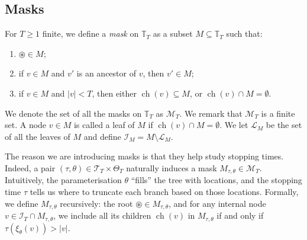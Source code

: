 \documentclass[10pt, a4paper]{article}
\newcommand{\Ell}{\mathcal L}
\newcommand{\I}{\mathcal I}
\newcommand{\ROOT}{\circledast}
\newcommand{\T}{\mathcal T}
\newcommand{\Tt}{\mathbb T}
\DeclareMathOperator{\ch}{ch}
\begin{document}
\subsection{Masks}

For $T\geq 1$ finite, we define a \emph{mask} on $\Tt_T$ as a subset $M\subseteq\Tt_T$ such that: 
\begin{enumerate}
    \item[$(i)$] $\ROOT\in M$; 
    \item[$(ii)$] if $v\in M$ and $v'$ is an ancestor of $v$, then $v'\in M$; 
    \item[$(iii)$] if $v\in M$ and $|v|<T$, then either $\ch(v)\subseteq M$, or $\ch(v)\cap M = \emptyset$.
\end{enumerate}
We denote the set of all the masks on $\Tt_T$ as $\mathcal{M}_T$. We remark that $\mathcal M_T$ is a finite set. A node $v \in M$ is called a leaf of $M$ if  $\ch(v)\cap M=\emptyset$. We let $\Ell_M$ be the set of all the leaves of $M$ and define $\I_M=M\setminus\Ell_M$.

The reason we are introducing masks is that they help study  stopping times. Indeed, a pair $(\tau, \theta) \in \T_T \times \Theta_T$ naturally induces a mask $M_{\tau,\theta} \in \mathcal{M}_T$. Intuitively, the parameterisation $\theta$ ``fills'' the tree with locations, and the stopping time $\tau$ tells us where to truncate each branch based on those locations. Formally, we define $M_{\tau,\theta}$ recursively: the root $\ROOT \in M_{\tau,\theta}$, and for any internal node $v \in \I_T \cap M_{\tau,\theta}$, we include all its children $\ch(v)$ in $M_{\tau,\theta}$ if and only if $\tau(\xi_\theta(v)) > |v|$.
\end{document}
